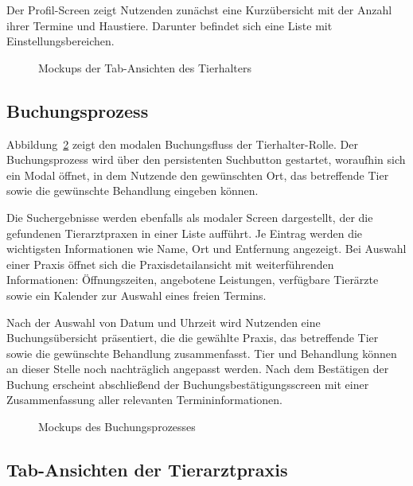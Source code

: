 Der Profil-Screen zeigt Nutzenden zunächst eine Kurzübersicht mit der Anzahl ihrer Termine und Haustiere. Darunter befindet sich eine Liste mit Einstellungsbereichen.

\begin{figure}[H]
    \centering
    
    \caption{Mockups der Tab-Ansichten des Tierhalters}
    \label{fig:mockup-tabs-tierhalter}
\end{figure}

\subsection{Buchungsprozess}

Abbildung~\ref{fig:mockup-buchung} zeigt den modalen Buchungsfluss der Tierhalter-Rolle. Der Buchungsprozess wird über den persistenten 
Suchbutton gestartet, woraufhin sich ein Modal öffnet, in dem Nutzende den gewünschten Ort, das betreffende Tier sowie die gewünschte
Behandlung eingeben können.

Die Suchergebnisse werden ebenfalls als modaler Screen dargestellt, der die gefundenen Tierarztpraxen in einer Liste aufführt. Je Eintrag 
werden die wichtigsten Informationen wie Name, Ort und Entfernung angezeigt. Bei Auswahl einer Praxis öffnet sich die Praxisdetailansicht mit weiterführenden Informationen: Öffnungszeiten, 
angebotene Leistungen, verfügbare Tierärzte sowie ein Kalender zur Auswahl eines freien Termins.

Nach der Auswahl von Datum und Uhrzeit wird Nutzenden eine Buchungsübersicht präsentiert, die die gewählte Praxis, das betreffende Tier sowie die gewünschte Behandlung zusammenfasst. Tier und Behandlung können an dieser Stelle noch nachträglich angepasst werden. Nach dem Bestätigen der Buchung erscheint abschließend der Buchungsbestätigungsscreen mit einer Zusammenfassung aller relevanten Termininformationen.

\begin{figure}[H]
    \centering
    
    \caption{Mockups des Buchungsprozesses}
    \label{fig:mockup-buchung}
\end{figure}
\clearpage

\subsection{Tab-Ansichten der Tierarztpraxis}

